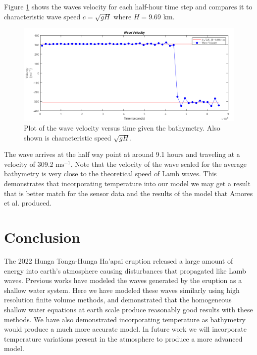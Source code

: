 \documentclass[twoside]{bsu-ms}
\begin{document}
Figure \ref{fig:4.6} shows the waves velocity for each half-hour time step and compares it to characteristic wave speed $c=\sqrt{gH}$ where $H=9.69$ $\mathrm{km}$.
\begin{figure}[!htbp]
    \centering
    \includegraphics[width=\textwidth]{images/bathwavevelocity.png}
    \caption{Plot of the wave velocity versus time given the bathymetry. Also shown is characteristic speed $\sqrt{g H}$. }
    \label{fig:4.6}
\end{figure}
The wave arrives at the half way point at around 9.1 hours and traveling at a velocity of 309.2 $\mathrm{ms}^{-1}$. Note that the velocity of the wave scaled for the average bathymetry is very close to the theoretical speed of Lamb waves. This demonstrates that incorporating temperature into our model we may get a result that is better match for the sensor data and the results of the model that Amores et al. \cite{amores2022numerical} produced.
%
%
\chapter{Conclusion}
The 2022 Hunga Tonga-Hunga Ha’apai eruption released a large amount of energy into earth's atmosphere causing disturbances that propagated like Lamb waves. Previous works have modeled the waves generated by the eruption as a shallow water system. Here we have modeled these waves similarly using high resolution finite volume methods, and demonstrated that the homogeneous shallow water equations at earth scale produce reasonably good results with these methods. We have also demonstrated incorporating temperature as bathymetry would produce a much more accurate model. In future work we will incorporate temperature variations present in the atmosphere to produce a more advanced model.
\backmatter
\end{document}
